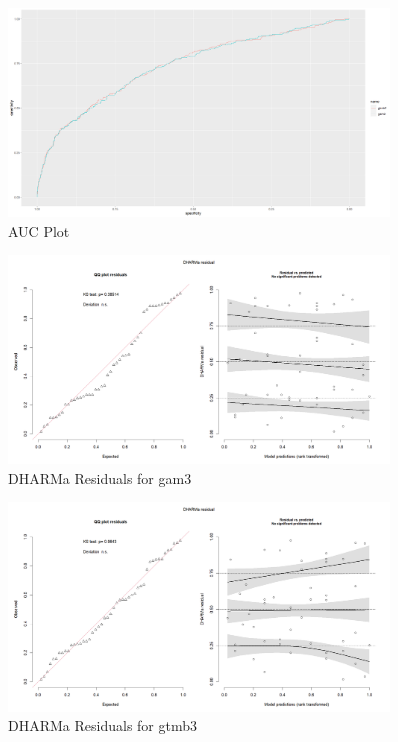 \begin{figure}[h]
    \centering
    \includegraphics[width=0.9\textwidth]{visuals/AUCplot.png}
    \caption{AUC Plot}
    \label{fig:aucplot}
\end{figure}

\begin{figure}[h]
    \centering
    \includegraphics[width=0.9\textwidth]{visuals/DHARMa_gam3.png}
    \caption{DHARMa Residuals for gam3}
    \label{fig:dharmagam3}
\end{figure}

\begin{figure}[h]
    \centering
    \includegraphics[width=0.9\textwidth]{visuals/DHARMa_gtmb3.png}
    \caption{DHARMa Residuals for gtmb3}
    \label{fig:dharmagtmb3}
\end{figure}

